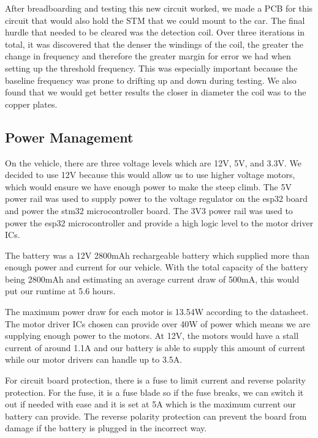 \documentclass[11pt]{article}
\begin{document}

After breadboarding and testing this new circuit worked, we made a PCB for this circuit that would also hold the STM that we could mount to the car. The final hurdle that needed to be cleared was the detection coil. Over three iterations in total, it was discovered that the denser the windings of the coil, the greater the change in frequency and therefore the greater margin for error we had when setting up the threshold frequency. This was especially important because the baseline frequency was prone to drifting up and down during testing. We also found that we would get better results the closer in diameter the coil was to the copper plates.

\subsection{Power Management}
On the vehicle, there are three voltage levels which are 12V, 5V, and 3.3V. We decided to use 12V because this would allow us to use higher voltage motors, which would ensure we have enough power to make the steep climb. The 5V power rail was used to supply power to the voltage regulator on the esp32 board and power the stm32 microcontroller board. The 3V3 power rail was used to power the esp32 microcontroller and provide a high logic level to the motor driver ICs.

The battery was a 12V 2800mAh rechargeable battery which supplied more than enough power and current for our vehicle. With the total capacity of the battery being 2800mAh and estimating an average current draw of 500mA, this would put our runtime at 5.6 hours.

The maximum power draw for each motor is 13.54W according to the datasheet. The motor driver ICs chosen can provide over 40W of power which means we are supplying enough power to the motors. At 12V, the motors would have a stall current of around 1.1A and our battery is able to supply this amount of current while our motor drivers can handle up to 3.5A.

For circuit board protection, there is a fuse to limit current and reverse polarity protection. For the fuse, it is a fuse blade so if the fuse breaks, we can switch it out if needed with ease and it is set at 5A which is the maximum current our battery can provide. The reverse polarity protection can prevent the board from damage if the battery is plugged in the incorrect way.
\end{document}
